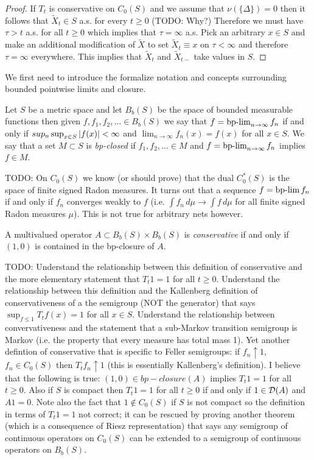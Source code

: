 \begin{proof}
If $T_t$ is conservative on $C_0(S)$ and we assume that $\nu(\lbrace \Delta \rbrace) = 0$ then it follows that $\tilde{X}_t \in S$ a.s. for every $t \geq 0$ (TODO: Why?)  Therefore we must have $\tau > t$ a.s. for all $t \geq 0$ which implies that $\tau = \infty$ a.s.  Pick an arbitrary $x \in S$ and make an additional modification of $\tilde{X}$ to set $\tilde{X}_t \equiv x$ on $\tau < \infty$ and therefore $\tau = \infty$ everywhere.  This implies that $\tilde{X}_t$ and $\tilde{X}_{t-}$ take values in $S$.
\end{proof}

We first need to introduce the formalize notation and concepts surrounding bounded pointwise limits and closure.

\begin{defn}Let $S$ be a metric space and let $B_b(S)$ be the space of bounded measurable functions then given $f, f_1, f_2, \dotsc \in B_b(S)$ we say that $f = \operatorname*{bp-lim}_{n \to \infty} f_n$ if and only if $sup_n \sup_{x \in S} \left \vert f(x) \right \vert < \infty$ and $\lim_{n \to \infty} f_n(x) = f(x)$ for all $x \in S$.  We say that a set $M \subset S$ is \emph{bp-closed} if $f_1, f_2, \dotsc \in M$ and $f = \operatorname*{bp-lim}_{n \to \infty} f_n$ implies $f \in M$.  
\end{defn}

TODO:  On $C_0(S)$ we know (or should prove) that the dual $C^*_0(S)$ is the space of finite signed Radon measures.  It turns out that a sequence $f = \operatorname*{bp-lim} f_n$ if and only if $f_n$ converges weakly to $f$ (i.e. $\int f_n \, d \mu \to \int f  \, d\mu$ for all finite signed Radon measures $\mu$).  This is not true for arbitrary nets however.

\begin{defn}A multivalued operator $A \subset B_b(S) \times B_b(S)$ is \emph{conservative} if and only if $(1,0)$ is contained in the bp-closure of $A$.
\end{defn}

TODO: Understand the relationship between this definition of conservative and the more elementary statement that $T_t 1 = 1$ for all $t \geq 0$.  Understand the relationship between this definition and the Kallenberg definition of conservativeness of a the semigroup (NOT the generator) that says $\sup_{f \leq 1} T_t f (x) = 1$ for all $x \in S$.  Understand the relationship between convervativeness and the statement that a sub-Markov transition semigroup is Markov (i.e. the property that every measure has total mass 1).  Yet another defintion of conservative that is specific to Feller semigroups: if $f_n \uparrow 1$, $f_n \in C_0(S)$ then $T_t f_n \uparrow 1$ (this is essentially Kallenberg's definition).  I believe that the following is true: $(1,0) \in bp-closure(A)$ implies $T_t 1 = 1$ for all $t \geq 0$.  Also if $S$ is compact then $T_t 1 = 1$ for all $t \geq 0$ if and only if $1 \in \mathcal{D}(A)$ and $A 1 = 0$.  Note also the fact that $1 \notin C_0(S)$ if $S$ is not compact so the definition in terms of $T_t 1 = 1$ not correct; it can be rescued by proving another theorem (which is a consequence of Riesz representation) that says any semigroup of continuous operators on $C_0(S)$ can be extended to a semigroup of continuous operators on $B_b(S)$.


